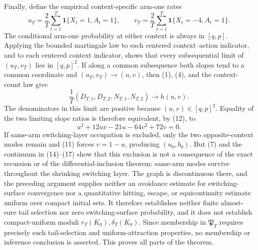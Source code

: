 Finally, define the empirical context-specific arm-one rates
\[
 u_T=\frac2T\sum_{t=1}^T\mathbf1\{X_t=1,A_t=1\},\qquad
 v_T=\frac2T\sum_{t=1}^T\mathbf1\{X_t=-4,A_t=1\}.
\]
The conditional arm-one probability at either context is always in \([q,p]\).  Applying the bounded martingale law to each centered context--action indicator, and to each centered context indicator, shows that every subsequential limit of \((u_T,v_T)\) lies in \([q,p]^2\).  If along a common subsequence both slopes tend to a common coordinate and \((u_T,v_T)\to(u,v)\), then (1), (4), and the context-count law give
\[
 \frac1T(D_{T,1},D_{T,2},N_{T,1},N_{T,2})\longrightarrow h(u,v).
\]
The denominators in this limit are positive because \((u,v)\in[q,p]^2\).  Equality of the two limiting slope ratios is therefore equivalent, by (12), to
\[
 u^2+12uv-21u-64v^2+72v=0.
\]
If same-arm switching-layer occupation is excluded, only the two opposite-context modes remain and (11) forces \(v=1-u\), producing \((u_0,b_0)\).  But (7) and the continuum in (14)--(17) show that this exclusion is not a consequence of the exact recursion or of the differential-inclusion theorem: same-arm modes survive throughout the shrinking switching layer.  The graph is discontinuous there, and the preceding argument supplies neither an avoidance estimate for switching-surface convergence nor a quantitative hitting, escape, or equicontinuity estimate uniform over compact initial sets.  It therefore establishes neither finite almost-sure tail selection nor zero switching-surface probability, and it does not establish compact-uniform moduli \(r_T(K_0),\delta_T(K_0)\).  Since membership in \(\mathfrak P_T\) requires precisely such tail-selection and uniform-attraction properties, no membership or inference conclusion is asserted.  This proves all parts of the theorem.